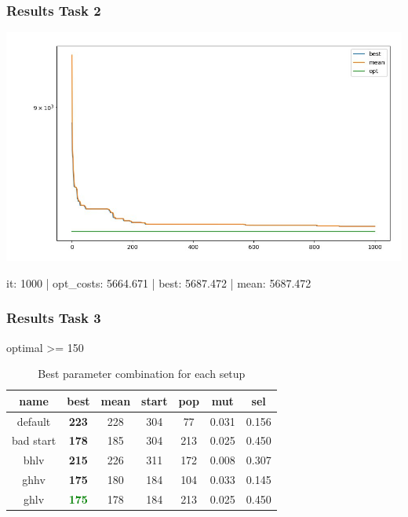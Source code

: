 \documentclass[
]{beamer}
\begin{document}
    \begin{frame}
    	\frametitle{Results Task 2}
		\includegraphics[width=\textwidth]{task2.jpg}
        \begin{center}
        it:  1000 | opt\_costs: 5664.671 | best: 5687.472 | mean: 5687.472
        \end{center}
    \end{frame}

    \begin{frame}
    	\frametitle{Results Task 3}
        	\begin{minipage}{\linewidth}
              \begin{table} 
              \centering
              \caption{optimal >= 150}
                  \begin{tabular}{c|ccc|ccc}
                  {\bf name} & {\bf best} & {\bf mean} & {\bf start} & {\bf pop} & {\bf mut} & {\bf sel}\\
                  \toprule[1.pt]
                  default & {\bf 223} & 228 & 304 & 77 & 0.031 & 0.156\\
                  bad start & {\bf 178} & 185 & 304 & 213 & 0.025 & 0.450\\
                  bhlv & {\bf 215} & 226 & 311 & 172 & 0.008 & 0.307\\
                  ghhv & {\bf 175} & 180 & 184 & 104 & 0.033 & 0.145\\
                  ghlv & \textcolor{green}{\bf 175} & 178 & 184 & 213 & 0.025 & 0.450\\
                  \bottomrule[1.pt]
                  \end{tabular}
              \\[10pt]
			  \caption*{Best parameter combination for each setup}
              \end{table}
        	\end{minipage}
    \end{frame} 
    
\end{document}
